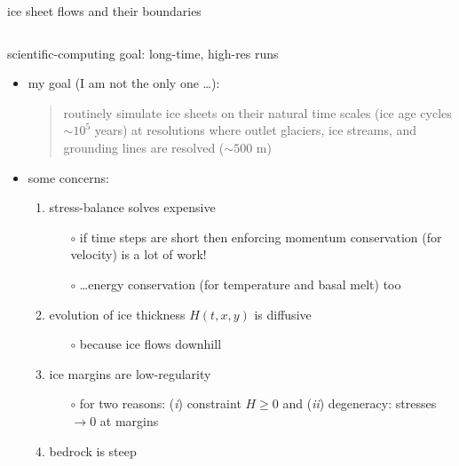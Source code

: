 \documentclass[hide notes,intlimits,usenames,dvipsnames]{beamer}
\begin{document}
\begin{frame}{ice sheet flows and their boundaries}
\begin{columns}
\begin{column}{0.6\textwidth}
\end{column}
\end{columns}
\end{frame}


\begin{frame}{scientific-computing goal: long-time, high-res runs}

\begin{itemize}
\item my goal (I am not the only one \dots):
\begin{quote}
routinely simulate ice sheets on their natural time scales (ice age cycles \alert{$\sim 10^5$ years}) at resolutions where outlet glaciers, ice streams, and grounding lines are resolved (\alert{$\sim 500$ m})
\end{quote}
\item some concerns:
    \begin{enumerate}
    \item stress-balance solves expensive
        \begin{itemize}
        \item[$\circ$] if time steps are short then enforcing momentum conservation (for velocity) is a lot of work!
        \item[$\circ$] \dots energy conservation (for temperature and basal melt) too
        \end{itemize}
    \item evolution of ice thickness $H(t,x,y)$ is diffusive
        \begin{itemize}
        \item[$\circ$] because ice flows downhill
        \end{itemize}
    \item ice margins are low-regularity
        \begin{itemize}
        \item[$\circ$] for two reasons: (\emph{i}) constraint $H\ge 0$ and (\emph{ii}) degeneracy: stresses $\to 0$ at margins
        \end{itemize}
    \item bedrock is steep
    \end{enumerate}
\end{itemize}
\end{frame}
\end{document}
